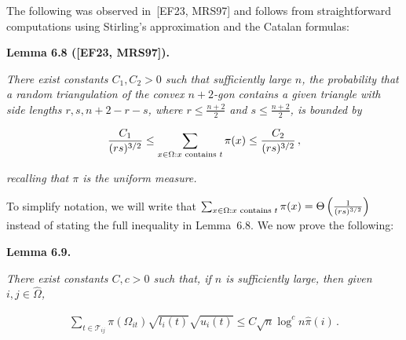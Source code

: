 \documentclass[10pt,a4paper]{article}
\begin{document}
The following was observed in [EF23, MRS97] and follows from straightforward computations using Stirling’s approximation and the Catalan formulas:\par





\par\medskip\noindent\textbf{\textbf{Lemma 6.8}\textbf{ }([EF23, MRS97])\textbf{.}}\par



\emph{There exist constants $C_{1},C_{2}>0$ such that sufficiently large $n$, the probability that a random triangulation of the convex $n+2$-gon contains a given triangle with side lengths $r,s,n+2-r-s$, where $r\leq\frac{n+2}{2}$ and $s\leq\frac{n+2}{2}$, is bounded by}\par


\[\begin{gathered}
\frac{C_{1}}{(rs)^{3/2}}\leq\sum_{x\in\Omega:x\textnormal{ contains }t}\pi(x)\leq\frac{C_{2}}{(rs)^{3/2}}\,,
\end{gathered}\]


\emph{recalling that $\pi$ is the uniform measure.}\par






To simplify notation, we will write that $\sum_{x\in\Omega:x\textnormal{ contains }t}\pi(x)=\Theta\left(\frac{1}{(rs)^{3/2}}\right)$ instead of stating the full inequality in Lemma 6.8. We now prove the following:\par





\par\medskip\noindent\textbf{\textbf{Lemma 6.9}\textbf{.}}\par



\emph{There exist constants $C,c>0$ such that, if $n$ is sufficiently large, then given $i,j\in\hat{\Omega}$,}\par


\[\begin{gathered}
\sum_{t\in\mathcal{T}_{ij}}\pi(\Omega_{it})\sqrt{l_{i}(t)}\sqrt{u_{i}(t)}\leq C\sqrt{n}\log^{c}n\hat{\pi}(i)\,.
\end{gathered}\]
\end{document}
